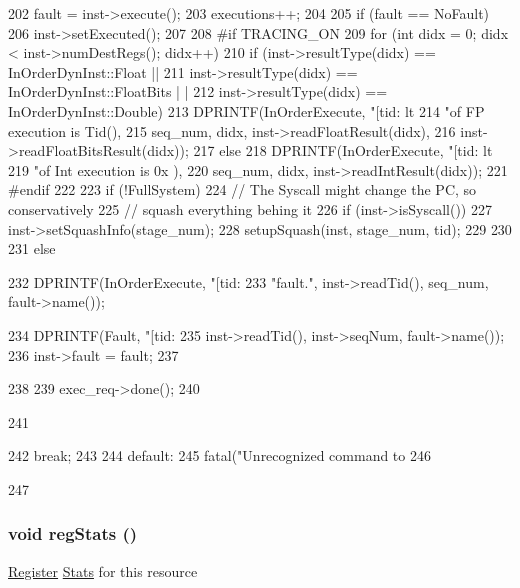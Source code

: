 \begin{DoxyCode}
{{{{202                 fault = inst->execute();
203                 executions++;
204 
205                 if (fault == NoFault) {
206                     inst->setExecuted();
207 
208 #if TRACING_ON
209                     for (int didx = 0; didx < inst->numDestRegs(); didx++)
210                         if (inst->resultType(didx) == InOrderDynInst::Float ||
211                             inst->resultType(didx) == InOrderDynInst::FloatBits |
      |
212                             inst->resultType(didx) == InOrderDynInst::Double)
213                             DPRINTF(InOrderExecute, "[tid:%
      lt %
214                                     "of FP execution is %
      Tid(),
215                                     seq_num, didx, inst->readFloatResult(didx),
216                                     inst->readFloatBitsResult(didx));
217                         else
218                             DPRINTF(InOrderExecute, "[tid:%
      lt %
219                                     "of Int execution is 0x%
      ),
220                                     seq_num, didx, inst->readIntResult(didx));
221 #endif
222 
223                     if (!FullSystem) {
224                         // The Syscall might change the PC, so conservatively
225                         // squash everything behing it
226                         if (inst->isSyscall()) {
227                             inst->setSquashInfo(stage_num);
228                             setupSquash(inst, stage_num, tid);
229                         }
230                     }
231                 } else {
232                     DPRINTF(InOrderExecute, "[tid:%
233                             "fault.\n", inst->readTid(), seq_num, fault->name());
      
234                     DPRINTF(Fault, "[tid:%
235                             inst->readTid(), inst->seqNum, fault->name());
236                     inst->fault = fault;
237                 }
238 
239                 exec_req->done();
240             }
241         }
242         break;
243 
244       default:
245         fatal("Unrecognized command to %
246     }
247 }
\end{DoxyCode}
\hypertarget{classExecutionUnit_a4dc637449366fcdfc4e764cdf12d9b11}{
\subsubsection[{regStats}]{\setlength{\rightskip}{0pt plus 5cm}void regStats ()}}
\label{classExecutionUnit_a4dc637449366fcdfc4e764cdf12d9b11}
\hyperlink{classRegister}{Register} \hyperlink{namespaceStats}{Stats} for this resource 

